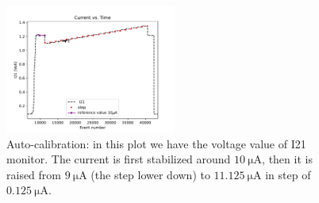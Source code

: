 \begin{figure}[!ht]
\centering
\includegraphics[width = 0.5\textwidth]{Analysis/Autocalib/Current.pdf}
\caption{Auto-calibration: in this plot we have the voltage value of I21 monitor. The current is first stabilized around $\SI{10}{\micro \ampere}$, then it is raised from $\SI{9}{\micro \ampere}$ (the step lower down) to $\SI{11.125}{\micro \ampere}$ in step of $\SI{0.125}{\micro \ampere}$.}
\label{fig:Autocalibration}
\end{figure}

